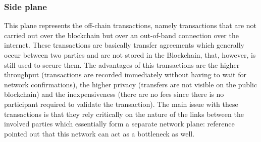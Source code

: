 \subsubsection{Side plane} This plane represents the off-chain transactions,
namely transactions that are not carried out over the blockchain but over an
out-of-band connection over the internet. These transactions are basically
transfer agreements which generally occur between two parties and are not stored
in the Blockchain, that, however, is still used to secure them. The advantages
of this transactions are the higher throughput (transactions are recorded
immediately without having to wait for network confirmations), the higher
privacy (transfers are not visible on the public blockchain) and the
inexpensiveness (there are no fees since there is no participant required to
validate the transaction). The main issue with these transactions is that they
rely critically on the nature of the links between the involved parties which
essentially form a separate network plane: reference
\cite{croman-scaling-blockchain} pointed out that this network can act as a
bottleneck as well.
